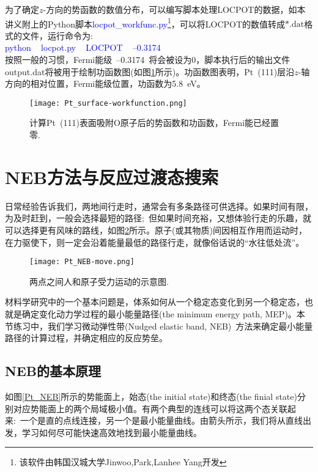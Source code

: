 为了确定$z$-方向的势函数的数值分布，可以编写脚本处理\textrm{LOCPOT}的数据，如本讲义附上的\textrm{Python}脚本\textcolor{blue}{\textrm{locpot\_workfunc.py}}\footnote{该软件由韩国汉城大学\textrm{Jinwoo,Park,Lanhee Yang}开发\cite{Park-Yang}}，可以将\textrm{LOCPOT}的数值转成$\ast\mathrm{.dat}$格式的文件，运行命令为:\\
\textcolor{blue}{\textrm{python ~ locpot.py ~ LOCPOT ~ --0.3174}}\\

按照一般的习惯，\textrm{Fermi}能级~--0.3174~将会被设为0，脚本执行后的输出文件\textrm{output.dat}将被用于绘制功函数图(如图\ref{Pt_surface-workfunction}所示)。功函数图表明，\textrm{Pt~(111)}层沿$z$-轴方向的相对位置，\textrm{Fermi}能级位置，功函数为\textrm{5.8}\textrm{~eV}。
\begin{figure}[h!]
\centering
\texttt{[image: Pt\_surface-workfunction.png]}
\caption{\small \textrm{计算\textrm{Pt~(111)}表面吸附\textrm{O}原子后的势函数和功函数，\textrm{Fermi}能已经置零.}}%
\label{Pt_surface-workfunction}
\end{figure}

\section{NEB方法与反应过渡态搜索}
日常经验告诉我们，两地间行走时，通常会有多条路径可供选择。如果时间有限，为及时赶到，一般会选择最短的路径;~但如果时间充裕，又想体验行走的乐趣，就可以选择更有风味的路线，如图\ref{Pt_NEB-move}所示。原子(或其物质)间因相互作用而运动时，在力驱使下，则一定会沿着能量最低的路径行走，就像俗话说的“水往低处流”。
\begin{figure}[h!]
\centering
\texttt{[image: Pt\_NEB-move.png]}
\caption{\small \textrm{两点之间人和原子受力运动的示意图.}}%
\label{Pt_NEB-move}
\end{figure}

材料学研究中的一个基本问题是，体系如何从一个稳定态变化到另一个稳定态，也就是确定变化动力学过程的最小能量路径\textrm{(the minimum energy path, MEP)}。本节练习中，我们学习微动弹性带\textrm{(Nudged elastic band, NEB)~}方法\cite{JCP113-9978_2000,JCP113-9901_2000,JCC32-1769_2011}来确定最小能量路径的计算过程，并确定相应的反应势垒。
\subsection{\rm{NEB}的基本原理}
如图\ref{Pt_NEB}所示的势能面上，始态\textrm{(the initial state)}和终态\textrm{(the finial state)}分别对应势能面上的两个局域极小值。有两个典型的连线可以将这两个态关联起来:~一个是直的点线连接，另一个是最小能量曲线。由箭头所示，我们将从直线出发，学习如何尽可能快速高效地找到最小能量曲线。

